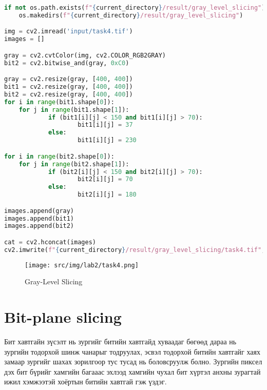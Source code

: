 \begin{lstlisting}[language=Python, caption=Gray-Level Slicing, frame=single]
	if not os.path.exists(f"{current_directory}/result/gray_level_slicing"):
	os.makedirs(f"{current_directory}/result/gray_level_slicing")

img = cv2.imread('input/task4.tif')
images = []

gray = cv2.cvtColor(img, cv2.COLOR_RGB2GRAY)
bit2 = cv2.bitwise_and(gray, 0xC0)

gray = cv2.resize(gray, [400, 400])
bit1 = cv2.resize(gray, [400, 400])
bit2 = cv2.resize(gray, [400, 400])
for i in range(bit1.shape[0]):
	for j in range(bit1.shape[1]):
			if (bit1[i][j] < 150 and bit1[i][j] > 70):
					bit1[i][j] = 37
			else:
					bit1[i][j] = 230

for i in range(bit2.shape[0]):
	for j in range(bit2.shape[1]):
			if (bit2[i][j] < 150 and bit2[i][j] > 70):
					bit2[i][j] = 70
			else:
					bit2[i][j] = 180

images.append(gray)
images.append(bit1)
images.append(bit2)

cat = cv2.hconcat(images)
cv2.imwrite(f"{current_directory}/result/gray_level_slicing/task4.tif", cat)
\end{lstlisting}

\begin{figure}
	\centering
	\texttt{[image: src/img/lab2/task4.png]}
	\caption{Gray-Level Slicing}
\end{figure}

\pagebreak

\section{Bit-plane slicing}

Бит хавтгайн зүсэлт нь зургийг битийн хавтгайд хуваадаг бөгөөд дараа нь зургийн тодорхой шинж чанарыг тодруулах, эсвэл тодорхой битийн хавтгайг хаях замаар зургийг шахах зорилгоор тус тусад нь боловсруулж болно. Зургийн пиксел дэх бит бүрийг хамгийн багааас эхлээд хамгийн чухал бит хүртэл анхны зурагтай ижил хэмжээтэй хоёртын битийн хавтгай гэж үздэг.

